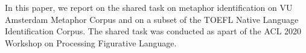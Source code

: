 In this paper, we report on the shared task on metaphor identification on VU Amsterdam Metaphor Corpus and on a subset of the TOEFL Native Language Identification Corpus. The shared task was conducted as apart of the ACL 2020 Workshop on Processing Figurative Language.
